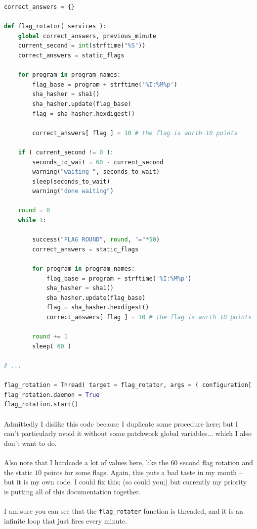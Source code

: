 \documentclass[11pt]{article}
\begin{document}
	\begin{lstlisting}[language=Python]
correct_answers = {}

def flag_rotator( services ):
	global correct_answers, previous_minute
	current_second = int(strftime("%S"))
	correct_answers = static_flags

	for program in program_names:
		flag_base = program + strftime('%I:%M%p')
		sha_hasher = sha1()
		sha_hasher.update(flag_base)
		flag = sha_hasher.hexdigest()

		correct_answers[ flag ] = 10 # the flag is worth 10 points

	if ( current_second != 0 ):
		seconds_to_wait = 60 - current_second
		warning("waiting ", seconds_to_wait)
		sleep(seconds_to_wait)
		warning("done waiting")

	round = 0
	while 1:

		success("FLAG ROUND", round, "="*50)
		correct_answers = static_flags

		for program in program_names:
			flag_base = program + strftime('%I:%M%p')
			sha_hasher = sha1()
			sha_hasher.update(flag_base)
			flag = sha_hasher.hexdigest()
			correct_answers[ flag ] = 10 # the flag is worth 10 points

		round += 1
		sleep( 60 )

# ...

flag_rotation = Thread( target = flag_rotator, args = ( configuration['services'],) )
flag_rotation.daemon = True
flag_rotation.start()
	\end{lstlisting}

	\hrulefill

	\paragraph{} Admittedly I dislike this code because I duplicate some procedure here; but I can't particularly avoid it without some patchwork global variables... which I also don't want to do. 

	\paragraph{} Also note that I hardcode a lot of values here, like the $60$ second flag rotation and the static $10$ points for some flags. Again, this puts a bad taste in my mouth -- but it is my own code. I could fix this; (so could you;) but currently my priority is putting all of this documentation together.

	\paragraph{} I am sure you can see that the \texttt{flag\_rotater} function is threaded, and it is an infinite loop that just fires every minute. 
\end{document}
